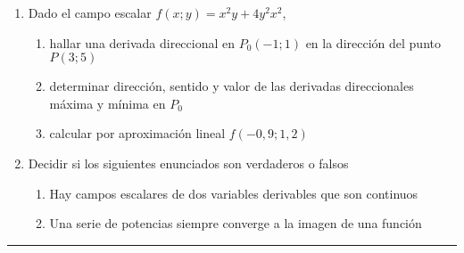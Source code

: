 \documentclass[9pt,a4paper]{extarticle}
\begin{document}
\begin{enumerate}
    \item Dado el campo escalar $f(x;y)=x^2y+4y^2x^2$, 
    \begin{enumerate}
        \item hallar una derivada direccional en $P_0 (-1;1)$ en la dirección del punto $P (3;5)$
        \item determinar dirección, sentido y valor de las derivadas direccionales máxima y mínima en $P_0$
        \item calcular por aproximación lineal $f(-0,9;1,2)$
    \end{enumerate}
    
    \item Decidir si los siguientes enunciados son verdaderos o falsos
    \begin{enumerate}
        \item Hay campos escalares de dos variables derivables que son continuos
        \item Una serie de potencias siempre converge a la imagen de una función
    \end{enumerate}
    
\end{enumerate}

\hrule
{}
\end{document}
